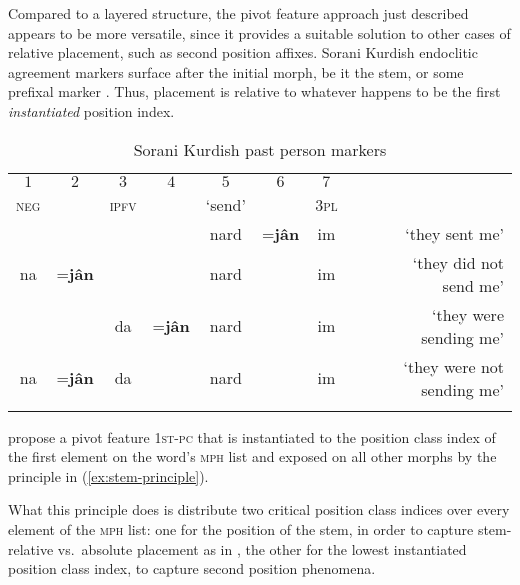 \documentclass[output=paper,biblatex,babelshorthands,newtxmath,draftmode,colorlinks,citecolor=brown]{langscibook}
\begin{document}
\begin{exe}
\begin{xlist}
\begin{exe}
\begin{xlist}
\largerpage[2]
Compared to a layered structure, the pivot feature approach just
described appears to be more versatile, since it provides a suitable
solution to other cases of relative placement, such as second position
affixes. Sorani Kurdish endoclitic agreement markers surface after the
initial morph, be it the stem, or some prefixal marker
\citep{Samvelian07}. Thus, placement is relative to whatever happens
to be the first \textit{instantiated} position index.

\begin{table}
\centering
{\small
\begin{tabular}[t]{ccccccc|lr}
\lsptoprule
$1$ & $2$ & $3$ & $4$ & $5$ & $6$ & $7$ &\\
\textsc{neg} & & \textsc{ipfv} & & `send' & & \textsc{3pl}\\   
\midrule
    &&      && nard &=\textbf{jân} & im & ~ &{`they sent me'}\\
na & =\textbf{jân}     &  & & nard & & im & ~ &{`they did not send me'}\\
   & & da & =\textbf{jân} & nard & & im & ~ &{`they were sending me'}\\
na & =\textbf{jân}     &  da  & & nard & & im & ~ & {`they were not sending me'}\\
\lspbottomrule
\end{tabular}
}
\caption{Sorani Kurdish past person markers\label{table-kurdish}}
\label{tab:Sorani}
\end{table}

\citet{bonami_o-crysmann_b13hpsg} propose a pivot feature \textsc{1st-pc} that is
instantiated to the position class index of the first element on the
word's \textsc{mph} list and exposed on all other morphs by the
principle in (\ref{ex:stem-principle}).

\begin{exe}
  \ex\label{ex:stem-principle}
\end{exe}

What this principle does is distribute two critical position class
indices over every element of the \textsc{mph} list: one for the
position of the stem, in order to capture stem-relative vs.\ absolute placement as
in , the other for the lowest instantiated position class index,
to capture second position phenomena. 


\end{xlist}
\end{exe}
\end{xlist}
\end{exe}
\end{document}
